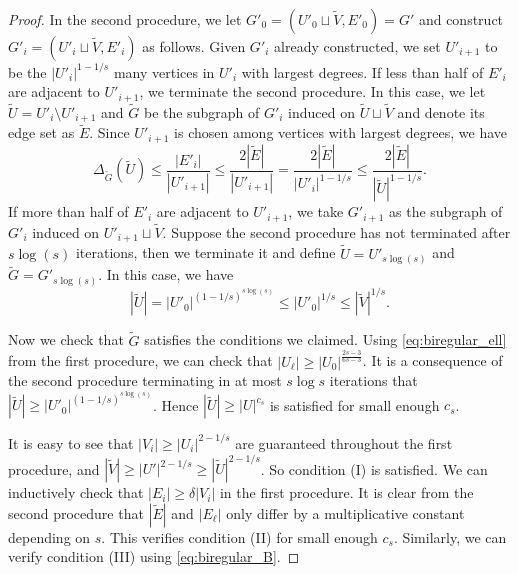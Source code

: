 \documentclass[10pt,a4paper]{amsart}
\begin{document}
\begin{proof}
    In the second procedure, we let $G'_0 = (U'_0 \sqcup \tilde{V}, E'_0) =G'$ and construct $G'_i = (U'_i \sqcup \tilde{V}, E'_i)$ as follows. Given $G'_i$ already constructed, we set $U'_{i+1}$ to be the $|U'_i|^{1-1/s}$ many vertices in $U'_i$ with largest degrees. If less than half of $E'_i$ are adjacent to $U'_{i+1}$, we terminate the second procedure. In this case, we let $\tilde{U} = U'_i \setminus U'_{i+1}$ and $\tilde{G}$ be the subgraph of $G'_i$ induced on $\tilde{U} \sqcup \tilde{V}$ and denote its edge set as $\tilde{E}$. Since $U'_{i+1}$ is chosen among vertices with largest degrees, we have \begin{equation}\label{eq:biregular_A1}
        \Delta_{\tilde{G}}(\tilde{U}) \leq \frac{|E'_i|}{|U'_{i+1}|} \leq \frac{2|\tilde{E}|}{|U'_{i+1}|} = \frac{2|\tilde{E}|}{|U'_i|^{1-1/s}} \leq \frac{2|\tilde{E}|}{|\tilde{U}|^{1-1/s}}.
    \end{equation} If more than half of $E'_i$ are adjacent to $U'_{i+1}$, we take $G'_{i+1}$ as the subgraph of $G'_i$ induced on $U'_{i+1}\sqcup \tilde{V}$. Suppose the second procedure has not terminated after $s\log(s)$ iterations, then we terminate it and define $\tilde{U} = U'_{s\log(s)}$ and $\tilde{G} = G'_{s\log(s)}$. In this case, we have \begin{equation}\label{eq:biregular_A2}
        |\tilde{U}| = |U'_0|^{(1-1/s)^{s\log(s)}} \leq |U'_0|^{1/s} \leq |\tilde{V}|^{1/s}.
    \end{equation}

    Now we check that $\tilde{G}$ satisfies the conditions we claimed. Using \eqref{eq:biregular_ell} from the first procedure, we can check that $|U_\ell| \geq |U_0|^{\frac{2s-3}{6s-3}}$. It is a consequence of the second procedure terminating in at most $s \log s $ iterations that $|\tilde{U}| \geq |U'_0|^{(1-1/s)^{s\log(s)}}$. Hence $|\tilde{U}| \geq |U|^{c_s}$ is satisfied for small enough $c_s$.

    It is easy to see that $|V_i| \geq |U_i|^{2-1/s}$ are guaranteed throughout the first procedure, and $|\tilde{V}| \geq |U'|^{2-1/s} \geq |\tilde{U}|^{2-1/s}$. So condition (I) is satisfied. We can inductively check that $|E_i| \geq \delta|V_i|$ in the first procedure. It is clear from the second procedure that $|\tilde{E}|$ and $|E_\ell|$ only differ by a multiplicative constant depending on $s$. This verifies condition (II) for small enough $c_s$. Similarly, we can verify condition (III) using \eqref{eq:biregular_B}.


\end{proof}
\end{document}
